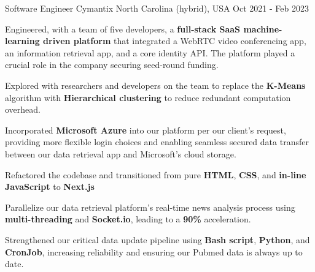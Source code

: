 \begin{cventries}
    \cventry
    {Software Engineer} %
    {Cymantix} %
    {North Carolina (hybrid), USA} %
    {Oct 2021 - Feb 2023} %
    {
      \begin{cvitems} %
        \item {Engineered, with a team of five developers, a \textbf{full-stack SaaS machine-learning driven platform} that integrated a WebRTC video conferencing app, an information retrieval app, and a core identity API. The platform played a crucial role in the company securing seed-round funding.}
        \item {Explored with researchers and developers on the team to replace the \textbf{K-Means} algorithm with \textbf{Hierarchical clustering} to reduce redundant computation overhead.}
        \item {Incorporated \textbf{Microsoft Azure} into our platform per our client's request, providing more flexible login choices and enabling seamless secured data transfer between our data retrieval app and Microsoft's cloud storage.}
        \item {Refactored the codebase and transitioned from pure \textbf{HTML}, \textbf{CSS}, and \textbf{in-line JavaScript} to \textbf{Next.js}}
        \item {Parallelize our data retrieval platform's real-time news analysis process using \textbf{multi-threading} and \textbf{Socket.io}, leading to a \textbf{90\%} acceleration.}
        \item {Strengthened our critical data update pipeline using \textbf{Bash script}, \textbf{Python}, and \textbf{CronJob}, increasing reliability and ensuring our Pubmed data is always up to date.}
      \end{cvitems}
    }


\end{cventries}
